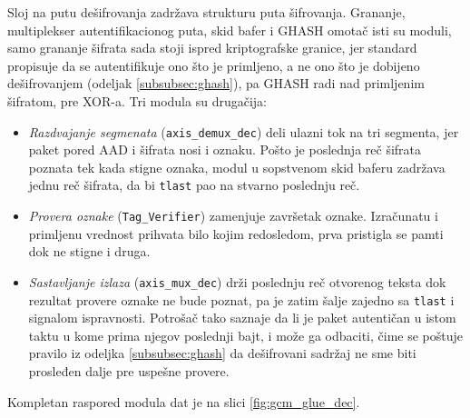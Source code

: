 Sloj na putu dešifrovanja zadržava strukturu puta šifrovanja. Grananje, multiplekser autentifikacionog puta, skid bafer i GHASH omotač isti su moduli, samo grananje šifrata sada stoji ispred kriptografske granice, jer standard propisuje da se autentifikuje ono što je primljeno, a ne ono što je dobijeno dešifrovanjem (odeljak \ref{subsubsec:ghash}), pa GHASH radi nad primljenim šifratom, pre XOR-a. Tri modula su drugačija:
\begin{itemize}[itemsep=2pt]
    \item \textit{Razdvajanje segmenata} (\texttt{axis\_demux\_dec}) deli ulazni tok na tri segmenta, jer paket pored AAD i šifrata nosi i oznaku. Pošto je poslednja reč šifrata poznata tek kada stigne oznaka, modul u sopstvenom skid baferu zadržava jednu reč šifrata, da bi \texttt{tlast} pao na stvarno poslednju reč.
    \item \textit{Provera oznake} (\texttt{Tag\_Verifier}) zamenjuje završetak oznake. Izračunatu i primljenu vrednost prihvata bilo kojim redosledom, prva pristigla se pamti dok ne stigne i druga.
    \item \textit{Sastavljanje izlaza} (\texttt{axis\_mux\_dec}) drži poslednju reč otvorenog teksta dok rezultat provere oznake ne bude poznat, pa je zatim šalje zajedno sa \texttt{tlast} i signalom ispravnosti. Potrošač tako saznaje da li je paket autentičan u istom taktu u kome prima njegov poslednji bajt, i može ga odbaciti, čime se poštuje pravilo iz odeljka \ref{subsubsec:ghash} da dešifrovani sadržaj ne sme biti prosleđen dalje pre uspešne provere.
\end{itemize}
Kompletan raspored modula dat je na slici \ref{fig:gcm_glue_dec}.

